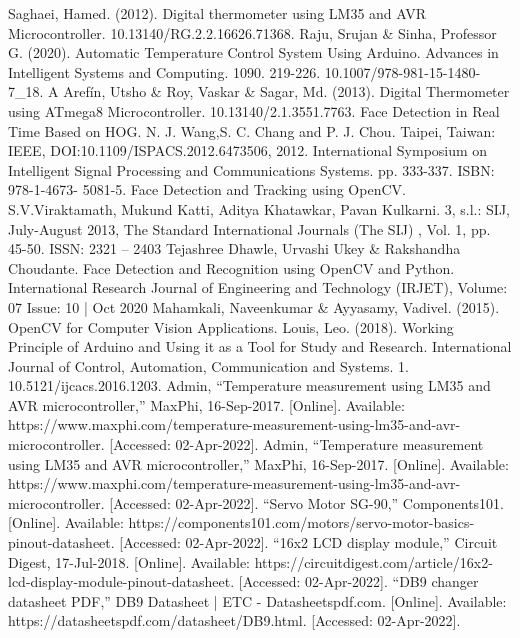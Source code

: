 \documentclass[conference]{IEEEtran}
\begin{document}
	\begin{thebibliography}{1}
		
		Saghaei, Hamed. (2012). Digital thermometer using LM35 and AVR Microcontroller. 10.13140/RG.2.2.16626.71368. 
		Raju, Srujan \& Sinha, Professor G. (2020). Automatic Temperature Control System Using Arduino. Advances in Intelligent Systems and Computing. 1090. 219-226. 10.1007/978-981-15-1480-7\_18. 
		A Arefín, Utsho \& Roy, Vaskar \& Sagar, Md. (2013). Digital Thermometer using ATmega8 Microcontroller. 10.13140/2.1.3551.7763.
		Face Detection in Real Time Based on HOG. N. J. Wang,S.
		C. Chang and P. J. Chou. Taipei, Taiwan: IEEE,
		DOI:10.1109/ISPACS.2012.6473506, 2012. International
		Symposium on Intelligent Signal Processing and
		Communications Systems. pp. 333-337. ISBN: 978-1-4673-
		5081-5.
		Face Detection and Tracking using OpenCV.
		S.V.Viraktamath, Mukund Katti, Aditya Khatawkar, Pavan
		Kulkarni. 3, s.l.: SIJ, July-August 2013, The Standard
		International Journals (The SIJ) , Vol. 1, pp. 45-50. ISSN: 2321
		– 2403
		Tejashree Dhawle, Urvashi Ukey \& Rakshandha Choudante. Face Detection and Recognition using OpenCV and Python. International Research Journal of Engineering and Technology (IRJET), Volume: 07 Issue: 10 | Oct 2020 
		Mahamkali, Naveenkumar \& Ayyasamy, Vadivel. (2015). OpenCV for Computer Vision Applications. 
		Louis, Leo. (2018). Working Principle of Arduino and Using it as a Tool for Study and Research. International Journal of Control, Automation, Communication and Systems. 1. 10.5121/ijcacs.2016.1203. 
		Admin, “Temperature measurement using LM35 and AVR microcontroller,” MaxPhi, 16-Sep-2017. [Online]. Available: https://www.maxphi.com/temperature-measurement-using-lm35-and-avr-microcontroller. [Accessed: 02-Apr-2022]. 
		Admin, “Temperature measurement using LM35 and AVR microcontroller,” MaxPhi, 16-Sep-2017. [Online]. Available: https://www.maxphi.com/temperature-measurement-using-lm35-and-avr-microcontroller. [Accessed: 02-Apr-2022]. 
		“Servo Motor SG-90,” Components101. [Online]. Available: https://components101.com/motors/servo-motor-basics-pinout-datasheet. [Accessed: 02-Apr-2022].
		“16x2 LCD display module,” Circuit Digest, 17-Jul-2018. [Online]. Available: https://circuitdigest.com/article/16x2-lcd-display-module-pinout-datasheet. [Accessed: 02-Apr-2022]. 
		“DB9 changer datasheet PDF,” DB9 Datasheet | ETC - Datasheetspdf.com. [Online]. Available: https://datasheetspdf.com/datasheet/DB9.html. [Accessed: 02-Apr-2022]. 
		
	\end{thebibliography}
\end{document}
